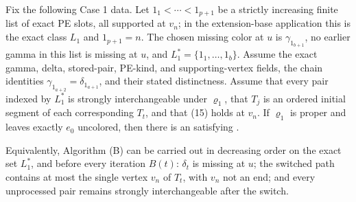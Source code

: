 \begin{lemma}
Fix the following Case 1 data.  Let
\(1_1<\cdots<1_{p+1}\) be a strictly increasing finite list of exact
PE slots, all supported at \(v_n\); in the extension-base application
this is the exact class \(L_1\) and \(1_{p+1}=n\).  The chosen missing color at \(u\) is
\(\gamma_{1_{b+1}}\), no earlier gamma in this list is missing at
\(u\), and
\(L_1^*=\{1_1,\ldots,1_b\}\).  Assume the exact gamma, delta, stored-pair,
PE-kind, and supporting-vertex fields, the chain identities
\(\gamma_{1_{a+2}}=\delta_{1_{a+1}}\), and their stated distinctness.
Assume that every pair indexed by \(L_1^*\) is strongly interchangeable
under \(\varrho_1\), that \(T_j\) is an ordered initial segment of each
corresponding \(T_t\), and that (15) holds at \(v_n\).  If
\(\varrho_1\) is proper and leaves exactly \(e_0\) uncolored, then there
is an  satisfying
.

Equivalently, Algorithm (B) can be carried out in decreasing order on
the exact set \(L_1^*\), and before every iteration \(B(t)\):
\(\delta_t\) is missing at \(u\); the switched path contains at most the
single vertex \(v_n\) of \(T_t\), with \(v_n\) not an end; and every
unprocessed pair remains strongly interchangeable after the switch.
\end{lemma}
